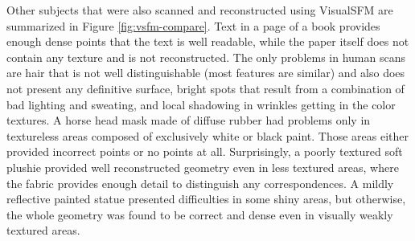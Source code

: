 

Other subjects that were also scanned and reconstructed using VisualSFM are summarized in Figure \ref{fig:vsfm-compare}.
Text in a page of a book provides enough dense points that the text is well readable, while the paper itself does not contain any texture and is not reconstructed.
The only problems in human scans are hair that is not well distinguishable (most features are similar) and also does not present any definitive surface, bright spots that result from a combination of bad lighting and sweating, and local shadowing in wrinkles getting in the color textures.
A horse head mask made of diffuse rubber had problems only in textureless areas composed of exclusively white or black paint.
Those areas either provided incorrect points or no points at all.
Surprisingly, a poorly textured soft plushie provided well reconstructed geometry even in less textured areas, where the fabric provides enough detail to distinguish any correspondences.
A mildly reflective painted statue presented difficulties in some shiny areas, but otherwise, the whole geometry was found to be correct and dense even in visually weakly textured areas.


